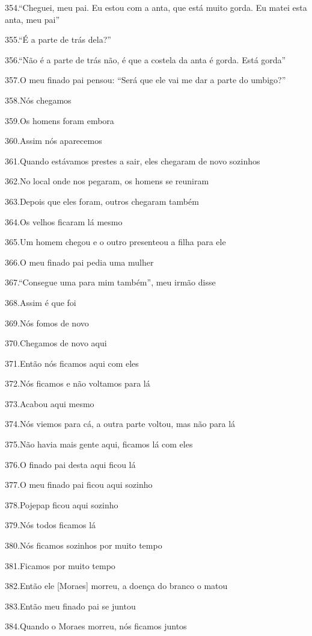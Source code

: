 354.``Cheguei, meu pai. Eu estou com a anta, que está muito gorda. Eu
matei esta anta, meu pai''

355.``É a parte de trás dela?''

356.``Não é a parte de trás não, é que a costela da anta é gorda. Está
gorda''

357.O meu finado pai pensou: ``Será que ele vai me dar a parte do
umbigo?''

358.Nós chegamos

359.Os homens foram embora

360.Assim nós aparecemos

361.Quando estávamos prestes a sair, eles chegaram de novo sozinhos

362.No local onde nos pegaram, os homens se reuniram

363.Depois que eles foram, outros chegaram também

364.Os velhos ficaram lá mesmo

365.Um homem chegou e o outro presenteou a filha para ele

366.O meu finado pai pedia uma mulher

367.``Consegue uma para mim também'', meu irmão disse

368.Assim é que foi

369.Nós fomos de novo

370.Chegamos de novo aqui

371.Então nós ficamos aqui com eles

372.Nós ficamos e não voltamos para lá

373.Acabou aqui mesmo

374.Nós viemos para cá, a outra parte voltou, mas não para lá

375.Não havia mais gente aqui, ficamos lá com eles

376.O finado pai desta aqui ficou lá

377.O meu finado pai ficou aqui sozinho

378.Pojepap ficou aqui sozinho

379.Nós todos ficamos lá

380.Nós ficamos sozinhos por muito tempo

381.Ficamos por muito tempo

382.Então ele {[}Moraes{]} morreu, a doença do branco o matou

383.Então meu finado pai se juntou

384.Quando o Moraes morreu, nós ficamos juntos

